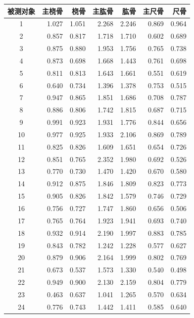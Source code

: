 
\begin{mvtable}
\label{tab:6.16}
\begin{tabular}{crrrrrr}
\toprule
被测对象 & 主桡骨 & 桡骨 & 主肱骨 & 肱骨 & 主尺骨 & 尺骨\\\midrule
1 & 1.027 & 1.051 & 2.268 & 2.246 & 0.869 & 0.964\\
2 & 0.857 & 0.817 & 1.718 & 1.710 & 0.602 & 0.689\\
3 & 0.875 & 0.880 & 1.953 & 1.756 & 0.765 & 0.738\\
4 & 0.873 & 0.698 & 1.668 & 1.443 & 0.761 & 0.698\\
5 & 0.811 & 0.813 & 1.643 & 1.661 & 0.551 & 0.619\\
6 & 0.640 & 0.734 & 1.396 & 1.378 & 0.753 & 0.515\\
7 & 0.947 & 0.865 & 1.851 & 1.686 & 0.708 & 0.787\\
8 & 0.886 & 0.806 & 1.742 & 1.815 & 0.687 & 0.715\\
9 & 0.991 & 0.923 & 1.931 & 1.776 & 0.844 & 0.656\\
10 & 0.977 & 0.925 & 1.933 & 2.106 & 0.869 & 0.789\\
11 & 0.825 & 0.826 & 1.609 & 1.651 & 0.654 & 0.726\\
12 & 0.851 & 0.765 & 2.352 & 1.980 & 0.692 & 0.526\\
13 & 0.770 & 0.730 & 1.470 & 1.420 & 0.670 & 0.580\\
14 & 0.912 & 0.875 & 1.846 & 1.809 & 0.823 & 0.773\\
15 & 0.905 & 0.826 & 1.842 & 1.579 & 0.746 & 0.729\\
16 & 0.756 & 0.727 & 1.747 & 1.860 & 0.656 & 0.506\\
17 & 0.765 & 0.764 & 1.923 & 1.941 & 0.693 & 0.740\\
18 & 0.932 & 0.914 & 2.190 & 1.997 & 0.883 & 0.785\\
19 & 0.843 & 0.782 & 1.242 & 1.228 & 0.577 & 0.627\\
20 & 0.879 & 0.906 & 2.164 & 1.999 & 0.802 & 0.769\\
21 & 0.673 & 0.537 & 1.573 & 1.330 & 0.540 & 0.498\\
22 & 0.949 & 0.900 & 2.130 & 2.159 & 0.804 & 0.779\\
23 & 0.463 & 0.637 & 1.041 & 1.265 & 0.570 & 0.634\\
24 & 0.776 & 0.743 & 1.442 & 1.411 & 0.585 & 0.640\\
\bottomrule
\end{tabular}
\end{mvtable}

